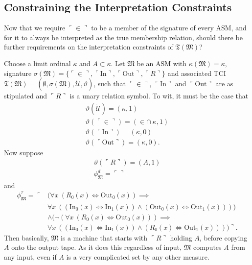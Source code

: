 \documentclass[12pt]{article}
\numberwithin{equation}{section}
\begin{document}
\subsection{Constraining the Interpretation Constraints} 

Now that we require $\ulcorner \in \urcorner$ to be a member of the signature of every ASM, and for it to always be interpreted as the true membership relation, should there be further requirements on the interpretation constraints of $\mathfrak{T}(\mathfrak{M})$?

\begin{ex}\label{ex217}
Choose a limit ordinal $\kappa$ and $A \subset \kappa$. Let $\mathfrak{M}$ be an ASM with $\kappa(\mathfrak{M}) = \kappa$, signature $\sigma(\mathfrak{M}) = \{\ulcorner \in \urcorner, \ulcorner \mathrm{In} \urcorner, \ulcorner \mathrm{Out} \urcorner, \ulcorner R \urcorner\}$ and associated TCI $\mathfrak{T}(\mathfrak{M}) = (\emptyset, \sigma(\mathfrak{M}), \dot{\mathcal{U}}, \vartheta)$, such that $\ulcorner \in \urcorner$, $\ulcorner \mathrm{In} \urcorner$ and $\ulcorner \mathrm{Out} \urcorner$ are as stipulated and $\ulcorner R \urcorner$ is a unary relation symbol. To wit, it must be the case that
\begin{gather*}
    \vartheta(\dot{\mathcal{U}}) = (\kappa, 1) \\
    \vartheta(\ulcorner \in \urcorner) = (\in \cap \ \kappa, 1) \\
    \vartheta(\ulcorner \mathrm{In} \urcorner) = (\kappa, 0) \\
    \vartheta(\ulcorner \mathrm{Out} \urcorner) = (\kappa, 0) \text{.}
\end{gather*}
Now suppose
\begin{gather*}
    \vartheta(\ulcorner R \urcorner) = (A, 1) \\
    \phi^d_{\mathfrak{M}} = \ulcorner \urcorner
\end{gather*}
and
\begin{align*}
    \phi^{\tau}_{\mathfrak{M}} = \ulcorner & (\forall x \ (R_0(x) \iff \mathrm{Out}_0(x)) \implies \\
    & \forall x \ ((\mathrm{In}_0(x) \iff \mathrm{In}_1(x)) \wedge (\mathrm{Out}_0(x) \iff \mathrm{Out}_1(x)))) \\
    & \wedge (\neg (\forall x \ (R_0(x) \iff \mathrm{Out}_0(x))) \implies \\
    & \forall x \ ((\mathrm{In}_0(x) \iff \mathrm{In}_1(x)) \wedge (R_0(x) \iff \mathrm{Out}_1(x)))) \urcorner \text{.}
\end{align*}
Then basically, $\mathfrak{M}$ is a machine that starts with $\ulcorner R \urcorner$ holding $A$, before copying $A$ onto the output tape. As it does this regardless of input, $\mathfrak{M}$ computes $A$ from any input, even if $A$ is a very complicated set by any other measure.
\end{ex}
\end{document}
